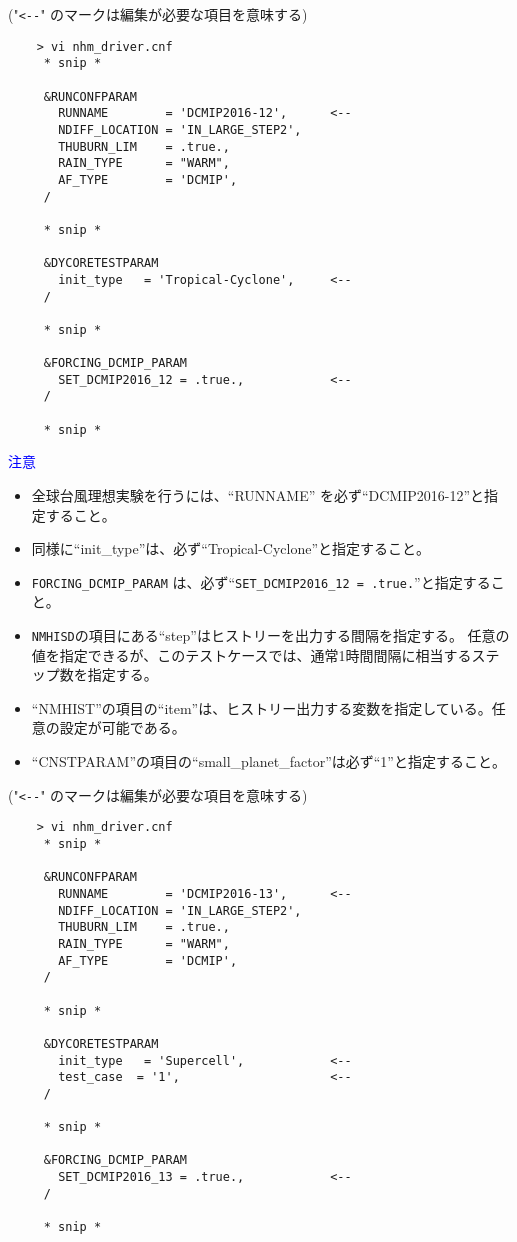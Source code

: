  \vspace{0.5cm}

 ("\verb|<--|" のマークは編集が必要な項目を意味する)
 \begin{verbatim}
    > vi nhm_driver.cnf
     * snip *

     &RUNCONFPARAM
       RUNNAME        = 'DCMIP2016-12',      <--
       NDIFF_LOCATION = 'IN_LARGE_STEP2',
       THUBURN_LIM    = .true.,
       RAIN_TYPE      = "WARM",
       AF_TYPE        = 'DCMIP',
     /

     * snip *

     &DYCORETESTPARAM
       init_type   = 'Tropical-Cyclone',     <--
     /

     * snip *

     &FORCING_DCMIP_PARAM
       SET_DCMIP2016_12 = .true.,            <--
     /

     * snip *
 \end{verbatim}

 \noindent \textcolor{blue}{{\sf 注意}}
 \begin{itemize}
   \item 全球台風理想実験を行うには、``RUNNAME'' を必ず``DCMIP2016-12''と指定すること。
   \item 同様に``init\_type''は、必ず``Tropical-Cyclone''と指定すること。
   \item \verb|FORCING_DCMIP_PARAM| は、必ず``\verb|SET_DCMIP2016_12 = .true.|''と指定すること。
   \item \verb|NMHISD|の項目にある``step''はヒストリーを出力する間隔を指定する。
           任意の値を指定できるが、このテストケースでは、通常1時間間隔に相当するステップ数を指定する。
   \item ``NMHIST''の項目の``item''は、ヒストリー出力する変数を指定している。任意の設定が可能である。
   \item ``CNSTPARAM''の項目の``small\_planet\_factor''は必ず``1''と指定すること。
 \end{itemize}

 \vspace{0.5cm}

 ("\verb|<--|" のマークは編集が必要な項目を意味する)
 \begin{verbatim}
    > vi nhm_driver.cnf
     * snip *

     &RUNCONFPARAM
       RUNNAME        = 'DCMIP2016-13',      <--
       NDIFF_LOCATION = 'IN_LARGE_STEP2',
       THUBURN_LIM    = .true.,
       RAIN_TYPE      = "WARM",
       AF_TYPE        = 'DCMIP',
     /

     * snip *

     &DYCORETESTPARAM
       init_type   = 'Supercell',            <--
       test_case  = '1',                     <--
     /

     * snip *

     &FORCING_DCMIP_PARAM
       SET_DCMIP2016_13 = .true.,            <--
     /

     * snip *
 \end{verbatim}

